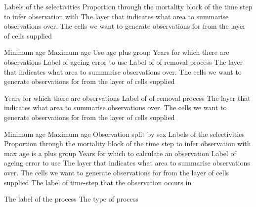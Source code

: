  {Labels of the selectivities}
 {Proportion through the mortality block of the time step to infer observation with}
 {The layer that indicates what area to summarise observations over.}
 {The cells we want to generate observations for from the layer of cells supplied}
\par\textbf{}\par
{} {Minimum age}
 {Maximum age}
 {Use age plus group}
 {Years for which there are observations}
 {Label of ageing error to use}
 {Label of of removal process}
 {The layer that indicates what area to summarise observations over.}
 {The cells we want to generate observations for from the layer of cells supplied}
\par\textbf{}\par
{} {Years for which there are observations}
 {Label of of removal process}
 {The layer that indicates what area to summarise observations over.}
 {The cells we want to generate observations for from the layer of cells supplied}
\par\textbf{}\par
{} {Minimum age}
 {Maximum age}
 {Observation split by sex}
 {Labels of the selectivities}
 {Proportion through the mortality block of the time step to infer observation with}
 {max age is a plus group}
 {Years for which to calculate an observation}
 {Label of ageing error to use}
 {The layer that indicates what area to summarise observations over.}
 {The cells we want to generate observations for from the layer of cells supplied}
 {The label of time-step that the observation occurs in}
\par\par
{} {The label of the process}
 {The type of process}
\par\textbf{}\par
